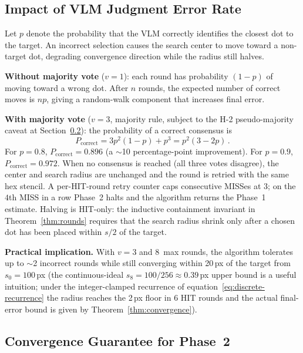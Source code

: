 \documentclass[sigconf,nonacm]{acmart}
\begin{document}
\subsection{Impact of VLM Judgment Error Rate}
\label{sec:error-rate}

Let $p$ denote the probability that the VLM correctly identifies the
closest dot to the target.  An incorrect selection causes the search
center to move toward a non-target dot, degrading convergence
direction while the radius still halves.

\textbf{Without majority vote} ($v=1$): each round has probability
$(1-p)$ of moving toward a wrong dot.  After $n$ rounds, the expected
number of correct moves is $np$, giving a random-walk component that
increases final error.

\textbf{With majority vote} ($v=3$, majority rule, subject to the
H-2 pseudo-majority caveat at Section~\ref{sec:convergence}):
the probability of a correct consensus is
\begin{equation}
  P_{\text{correct}} = 3p^2(1-p) + p^3 = p^2(3-2p)\,.
  \label{eq:majority}
\end{equation}
For $p=0.8$, $P_{\text{correct}} = 0.896$ (a $\sim$10 percentage-point
improvement).  For $p=0.9$, $P_{\text{correct}} = 0.972$.
When no consensus is reached (all three votes disagree), the center
and search radius are unchanged and the round is retried with the
same hex stencil.  A per-HIT-round retry counter caps consecutive
MISSes at $3$; on the $4$th MISS in a row Phase~2 halts and the
algorithm returns the Phase~1 estimate.  Halving is HIT-only: the
inductive containment invariant in Theorem~\ref{thm:rounds} requires
that the search radius shrink only after a chosen dot has been placed
within $s/2$ of the target.

\textbf{Practical implication.} With $v=3$ and 8~max rounds, the
algorithm tolerates up to $\sim$2 incorrect rounds while still
converging within 20\,px of the target from $s_0 = 100$\,px (the continuous-ideal $s_8 = 100/256 \approx 0.39$\,px upper bound is a useful intuition; under the integer-clamped recurrence of equation~\eqref{eq:discrete-recurrence} the radius reaches the 2\,px floor in 6 HIT rounds and the actual final-error bound is given by Theorem~\ref{thm:convergence}).


\subsection{Convergence Guarantee for Phase~2}
\label{sec:convergence}
\end{document}
